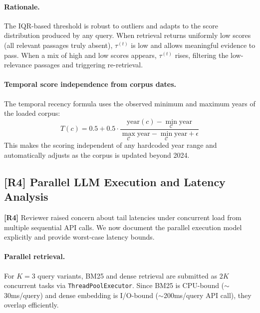 \documentclass[12pt,a4paper]{article}
\newcommand{\response}[2]{%
  \vspace{4pt}
  \noindent\colorbox{yellow!20}{\parbox{\dimexpr\linewidth-2\fboxsep}{%
    \small\textbf{\color{revcolor}[R#1]} #2}}\vspace{4pt}}
\begin{document}
\paragraph{Rationale.} The IQR-based threshold is robust to outliers and adapts
to the score distribution produced by any query. When retrieval returns
uniformly low scores (all relevant passages truly absent), $\tau^{(t)}$ is low
and allows meaningful evidence to pass. When a mix of high and low scores appears,
$\tau^{(t)}$ rises, filtering the low-relevance passages and triggering re-retrieval.

\paragraph{Temporal score independence from corpus dates.}
The temporal recency formula uses the observed minimum and maximum years of the
loaded corpus:
\begin{equation}
T(c) = 0.5 + 0.5 \cdot \frac{\text{year}(c) - \min_{\mathcal{C}}\text{year}}{\max_{\mathcal{C}}\text{year} - \min_{\mathcal{C}}\text{year} + \epsilon}
\label{eq:temporal}
\end{equation}
This makes the scoring independent of any hardcoded year range and automatically
adjusts as the corpus is updated beyond 2024.

\subsection{[R4] Parallel LLM Execution and Latency Analysis}
\label{sec:parallel}

\response{4}{Reviewer raised concern about tail latencies under concurrent load
from multiple sequential API calls. We now document the parallel execution model
explicitly and provide worst-case latency bounds.}

\paragraph{Parallel retrieval.} For $K{=}3$ query variants, BM25 and dense
retrieval are submitted as $2K$ concurrent tasks via \texttt{ThreadPoolExecutor}.
Since BM25 is CPU-bound ($\sim$30ms/query) and dense embedding is I/O-bound
($\sim$200ms/query API call), they overlap efficiently.
\end{document}
